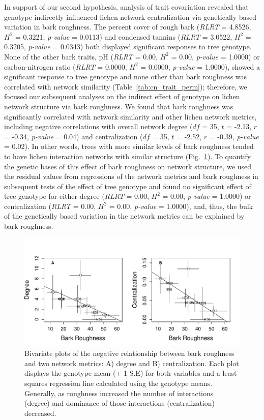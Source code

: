 \documentclass[fleqn,12pt]{olplainarticle}
\begin{document}
In support of our second hypothesis, analysis of trait covariation
revealed that genotype indirectly influenced lichen network
centralization via genetically based variation in bark roughness. The
percent cover of rough bark (\textit{RLRT} = 4.8526, $H^2$ = 0.3221,
\textit{p-value} = 0.0113) and condensed tannins (\textit{RLRT} =
3.0522, $H^2$ = 0.3205, \textit{p-value} = 0.0343) both displayed
significant responses to tree genotype. None of the other bark traits,
pH (\textit{RLRT} = 0.00, $H^2$ = 0.00, \textit{p-value} = 1.0000) or
carbon-nitrogen ratio (\textit{RLRT} = 0.0000, $H^2$ = 0.0000,
\textit{p-value} = 1.0000), showed a significant response to tree
genotype and none other than bark roughness was correlated with
network similarity (Table~\ref{tab:cn_trait_perm}); therefore, we
focused our subsequent analyses on the indirect effect of genotype on
lichen network structure via bark roughness. We found that bark
roughness was significantly correlated with network similarity and
other lichen network metrics, including negative correlations with
overall network degree ($df$ = 35, $t$ = -2.13, $r$ = -0.34,
\textit{p-value} = 0.04) and centralization ($df$ = 35, $t$ = -2.52,
$r$ = -0.39, \textit{p-value} = 0.02). In other words, trees with more
similar levels of bark roughness tended to have lichen interaction
networks with similar structure (Fig.~\ref{fig:br_net}). To quantify
the genetic bases of this effect of bark roughness on network
structure, we used the residual values from regressions of the network
metrics and bark roughness in subsequent tests of the effect of tree
genotype and found no significant effect of tree genotype for either
degree (\textit{RLRT} = 0.00, $H^2$ = 0.00, \textit{p-value} = 1.0000)
or centralization (\textit{RLRT} = 0.00, $H^2$ = 0.00,
\textit{p-value} = 1.0000), and, thus, the bulk of the genetically
based variation in the network metrics can be explained by bark
roughness.



\begin{figure}[ht]
\centering
\includegraphics[width=\linewidth]{figures/br_net.pdf}
\caption{Bivariate plots of the negative relationship between bark
  roughness and two network metrics: A) degree and B)
  centralization. Each plot displays the genotype mean ($\pm$ 1 S.E)
  for both variables and a least-squares regression line calculated
  using the genotype means. Generally, as roughness increased the
  number of interactions (degree) and dominance of
  those interactions (centralization) decreased.}
\label{fig:br_net}
\end{figure}
\end{document}
